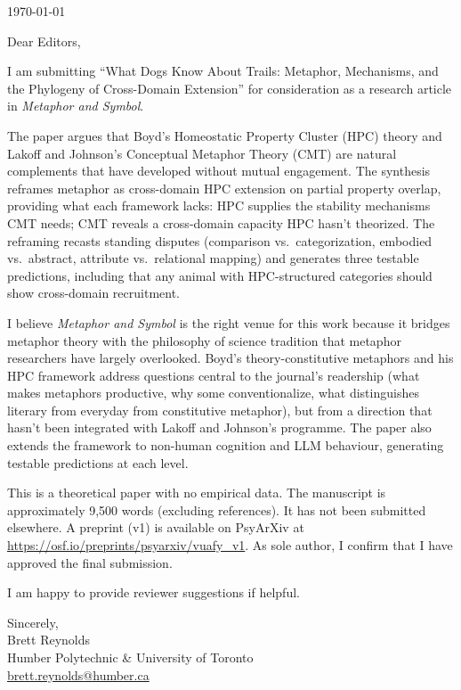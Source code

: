 \documentclass[12pt]{article}
\begin{document}
\thispagestyle{empty}

\noindent\today

\bigskip

\noindent Dear Editors,

\medskip

I am submitting ``What Dogs Know About Trails: Metaphor, Mechanisms, and the Phylogeny of Cross-Domain Extension'' for consideration as a research article in \textit{Metaphor and Symbol}.

The paper argues that Boyd's Homeostatic Property Cluster (HPC) theory and Lakoff and Johnson's Conceptual Metaphor Theory (CMT) are natural complements that have developed without mutual engagement. The synthesis reframes metaphor as cross-domain HPC extension on partial property overlap, providing what each framework lacks: HPC supplies the stability mechanisms CMT needs; CMT reveals a cross-domain capacity HPC hasn't theorized. The reframing recasts standing disputes (comparison vs.\ categorization, embodied vs.\ abstract, attribute vs.\ relational mapping) and generates three testable predictions, including that any animal with HPC-structured categories should show cross-domain recruitment.

I believe \textit{Metaphor and Symbol} is the right venue for this work because it bridges metaphor theory with the philosophy of science tradition that metaphor researchers have largely overlooked. Boyd's theory-constitutive metaphors and his HPC framework address questions central to the journal's readership (what makes metaphors productive, why some conventionalize, what distinguishes literary from everyday from constitutive metaphor), but from a direction that hasn't been integrated with Lakoff and Johnson's programme. The paper also extends the framework to non-human cognition and LLM behaviour, generating testable predictions at each level.

This is a theoretical paper with no empirical data. The manuscript is approximately 9,500 words (excluding references). It has not been submitted elsewhere. A preprint (v1) is available on PsyArXiv at \url{https://osf.io/preprints/psyarxiv/vuafy_v1}. As sole author, I confirm that I have approved the final submission.

I am happy to provide reviewer suggestions if helpful.

\bigskip

\noindent Sincerely,\\
Brett Reynolds\\
Humber Polytechnic \& University of Toronto\\
\href{mailto:brett.reynolds@humber.ca}{brett.reynolds@humber.ca}
\end{document}
